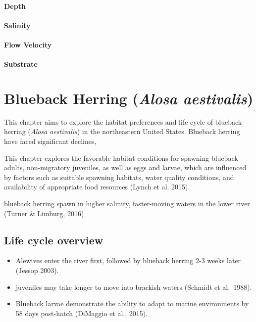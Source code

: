 \documentclass[
]{book}
\providecommand{\tightlist}{%
  \setlength{\itemsep}{0pt}\setlength{\parskip}{0pt}}
\begin{document}
\hypertarget{depth-5}{%
\subsubsection{Depth}\label{depth-5}}

\hypertarget{salinity-5}{%
\subsubsection{Salinity}\label{salinity-5}}

\hypertarget{flow-velocity-5}{%
\subsubsection{Flow Velocity}\label{flow-velocity-5}}

\hypertarget{substrate-5}{%
\subsubsection{Substrate}\label{substrate-5}}

\hypertarget{blueback-herring-alosa-aestivalis}{%
\chapter{\texorpdfstring{Blueback Herring (\emph{Alosa aestivalis})}{Blueback Herring (Alosa aestivalis)}}\label{blueback-herring-alosa-aestivalis}}

This chapter aims to explore the habitat preferences and life cycle of blueback herring (\emph{Alosa aestivalis}) in the northeastern United States.
Blueback herring have faced significant declines,

This chapter explores the favorable habitat conditions for spawning blueback adults, non-migratory juveniles, as well as eggs and larvae, which are influenced by factors such as suitable spawning habitats, water quality conditions, and availability of appropriate food resources (Lynch et al. 2015).

blueback herring spawn in higher salinity, faster-moving waters in the lower river (Turner \& Limburg, 2016)

\hypertarget{life-cycle-overview-1}{%
\section{Life cycle overview}\label{life-cycle-overview-1}}

\begin{itemize}
\tightlist
\item
  Alewives enter the river first, followed by blueback herring 2-3 weeks later (Jessop 2003).
\item
  juveniles may take longer to move into brackish waters (Schmidt et al.~1988).
\item
  Blueback larvae demonstrate the ability to adapt to marine environments by 58 days post-hatch (DiMaggio et al., 2015).
\end{itemize}
\end{document}
